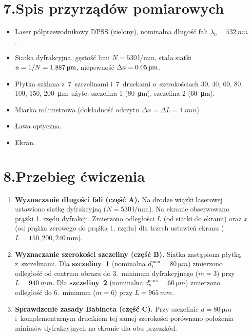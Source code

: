 \documentclass[a4paper,12pt]{article}
\begin{document}
\section*{7.\quad Spis przyrządów pomiarowych}

\begin{itemize}
  \item Laser półprzewodnikowy DPSS (zielony), nominalna długość fali
        $\lambda_0 = \SI{532}{nm}$.
  \item Siatka dyfrakcyjna, gęstość linii $N = 530\,\text{l/mm}$,
        stała siatki $a = 1/N = \SI{1{,}887}{\micro m}$,
        niepewność $\Delta a = \SI{0{,}05}{\micro m}$.
  \item Płytka szklana z~7~szczelinami i~7~druckami o~szerokościach
        30, 40, 60, 80, 100, 150, \SI{200}{\micro m}; użyte: szczelina 1
        (\SI{80}{\micro m}), szczelina 2 (\SI{60}{\micro m}).
  \item Miarka milimetrowa (dokładność odczytu $\Delta x = \Delta L = \SI{1}{mm}$).
  \item Ława optyczna.
  \item Ekran.
\end{itemize}

\section*{8.\quad Przebieg ćwiczenia}

\begin{enumerate}
  \item \textbf{Wyznaczanie długości fali (część A).} Na drodze wiązki laserowej
        ustawiono siatkę dyfrakcyjną ($N = 530\,\text{l/mm}$). Na ekranie obserwowano
        prążki 1. rzędu dyfrakcji. Zmierzono odległości $L$ (od siatki do ekranu)
        oraz $x$ (od prążka zerowego do prążka 1. rzędu) dla trzech ustawień
        ekranu ($L = 150, 200, 240\,\text{mm}$).

  \item \textbf{Wyznaczanie szerokości szczeliny (część B).} Siatka zastąpiona
        płytką z~szczelinami. Dla \textbf{szczeliny~1} (nominalna
        $d_1^{\text{nom}} = \SI{80}{\micro m}$) zmierzono odległość od centrum
        obrazu do 3.~minimum dyfrakcyjnego ($m = 3$) przy $L = \SI{940}{mm}$.
        Dla \textbf{szczeliny~2} (nominalna $d_2^{\text{nom}} = \SI{60}{\micro m}$)
        zmierzono odległość do 6.~minimum ($m = 6$) przy $L = \SI{965}{mm}$.

  \item \textbf{Sprawdzenie zasady Babineta (część C).} Przy szczelinie
        $d = \SI{80}{\micro m}$ i~komplementarnym drucikiem tej samej szerokości
        porównano położenia minimów dyfrakcyjnych na ekranie dla obu przeszkód.
\end{enumerate}
\end{document}
